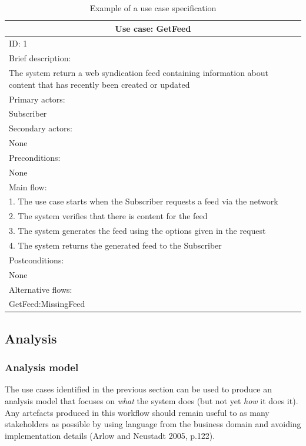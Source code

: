 \documentclass{article}
\begin{document}
\begin{table}[t]
\begin{center}
\begin{tabular}{ | p{\textwidth} |}
\hline
\multicolumn{1}{|c|}{Use case: GetFeed} \\
\hline
ID: 1 \\
\hline
Brief description: \\
The system return a web syndication feed containing information about content that has recently been created or updated \\
\hline
Primary actors: \\
Subscriber \\
\hline
Secondary actors: \\
None \\
\hline
Preconditions: \\
None \\
\hline
Main flow: \\
1. The use case starts when the Subscriber requests a feed via the network \\
2. The system verifies that there is content for the feed \\
3. The system generates the feed using the options given in the request \\
4. The system returns the generated feed to the Subscriber \\
\hline
Postconditions: \\
None \\
\hline
Alternative flows: \\
GetFeed:MissingFeed \\
\hline
\end{tabular}
\end{center}
\caption{Example of a use case specification}
\label{use-case-detail}
\end{table}

\subsection{Analysis}

\subsubsection{Analysis model}

The use cases identified in the previous section can be used to produce an analysis model that focuses on \textit{what} the system does (but not yet \textit{how} it does it). Any artefacts produced in this workflow should remain useful to as many stakeholders as possible by using language from the business domain and avoiding implementation details (Arlow and Neustadt 2005, p.122).
\end{document}
